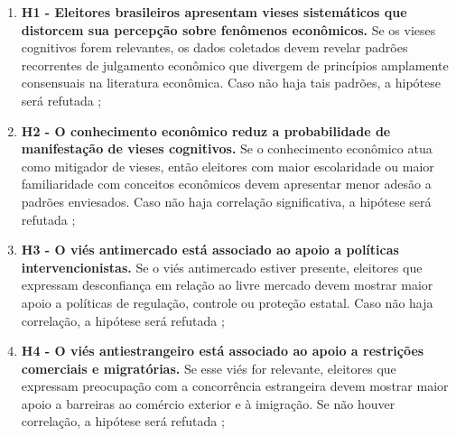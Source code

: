 \begin{enumerate}[label=\alph*)]

    \item \textbf{H1 - Eleitores brasileiros apresentam vieses sistemáticos que distorcem sua percepção sobre fenômenos econômicos.}  
    Se os vieses cognitivos forem relevantes, os dados coletados devem revelar padrões recorrentes de julgamento econômico que divergem de princípios amplamente consensuais na literatura econômica. Caso não haja tais padrões, a hipótese será refutada \cite{The_Myth_of_the_Rational_Voter, blendon1997};

    \item \textbf{H2 - O conhecimento econômico reduz a probabilidade de manifestação de vieses cognitivos.}  
    Se o conhecimento econômico atua como mitigador de vieses, então eleitores com maior escolaridade ou maior familiaridade com conceitos econômicos devem apresentar menor adesão a padrões enviesados. Caso não haja correlação significativa, a hipótese será refutada \cite{downs1957economic, Judgment_under_Uncertainty};

    \item \textbf{H3 - O viés antimercado está associado ao apoio a políticas intervencionistas.}  
    Se o viés antimercado estiver presente, eleitores que expressam desconfiança em relação ao livre mercado devem mostrar maior apoio a políticas de regulação, controle ou proteção estatal. Caso não haja correlação, a hipótese será refutada \cite{The_Myth_of_the_Rational_Voter, sowell2004applied};

    \item \textbf{H4 - O viés antiestrangeiro está associado ao apoio a restrições comerciais e migratórias.}  
    Se esse viés for relevante, eleitores que expressam preocupação com a concorrência estrangeira devem mostrar maior apoio a barreiras ao comércio exterior e à imigração. Se não houver correlação, a hipótese será refutada \cite{The_Myth_of_the_Rational_Voter, bhagwati2003free};


\end{enumerate}
